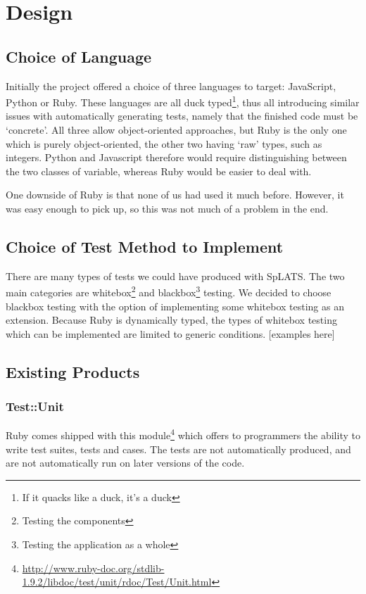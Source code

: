 \chapter{Design}

\section{Choice of Language}
  Initially the project offered a choice of three languages to target: JavaScript, Python or Ruby.
  These languages are all duck typed\footnote{If it quacks like a duck, it's a duck}, thus all introducing similar issues with automatically generating tests, namely that the finished code must be `concrete'.
  All three allow object-oriented approaches, but Ruby is the only one which is purely object-oriented, the other two having `raw' types, such as integers.
  Python and Javascript therefore would require distinguishing between the two classes of variable, whereas Ruby would be easier to deal with.

  One downside of Ruby is that none of us had used it much before.
  However, it was easy enough to pick up, so this was not much of a problem in the end.

\section{Choice of Test Method to Implement}
  There are many types of tests we could have produced with SpLATS.
  The two main categories are whitebox\footnote{Testing the components} and blackbox\footnote{Testing the application as a whole} testing.
  We decided to choose blackbox testing with the option of implementing some whitebox testing as an extension.
  Because Ruby is dynamically typed, the types of whitebox testing which can be implemented are limited to generic conditions.
  [examples here]

\section{Existing Products}

  \subsection{Test::Unit}
    Ruby comes shipped with this module\footnote{\url{http://www.ruby-doc.org/stdlib-1.9.2/libdoc/test/unit/rdoc/Test/Unit.html}} which offers to programmers the ability to write test suites, tests and cases.
    The tests are not automatically produced, and are not automatically run on later versions of the code.

